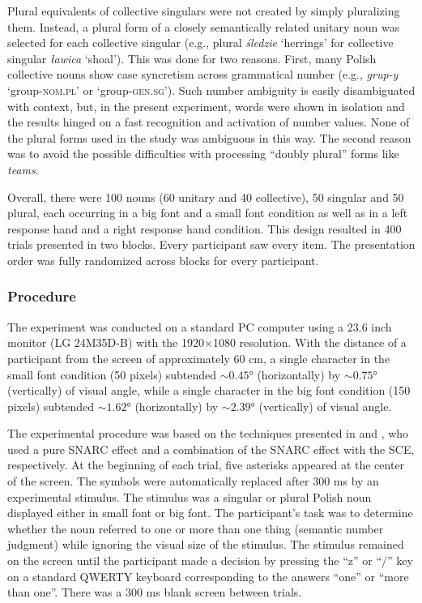 \documentclass[output=paper]{langscibook}
\begin{document}
Plural equivalents of collective singulars were not created by simply pluralizing them. Instead, a plural form of a closely semantically related unitary noun was selected for each collective singular (e.g., plural \textit{śledzie} ‘herrings’ for collective singular \textit{ławica} ‘shoal’). This was done for two reasons. First, many Polish collective nouns show case syncretism across grammatical number (e.g., \mbox{\textit{grup-y}} ‘group-\textsc{nom.pl}’ or ‘group-\textsc{gen.sg}’). Such number ambiguity is easily disambiguat\-ed with context, but, in the present experiment, words were shown in isolation and the results hinged on a fast recognition and activation of number values. None of the plural forms used in the study was ambiguous in this way. The second reason was to avoid the possible difficulties with processing “doubly plural” forms like \textit{teams}. 

Overall, there were 100 nouns (60 unitary and 40 collective), 50 singular and 50 plural, each occurring in a big font and a small font condition as well as in a left response hand and a right response hand condition. This design resulted in 400 trials presented in two blocks. Every participant saw every item. The presentation order was fully randomized across blocks for every participant.

\subsubsection{Procedure}
The experiment was conducted on a standard PC computer using a 23.6 inch monitor (LG 24M35D-B) with the 1920×1080 resolution. With the distance of a participant from the screen of approximately 60 cm, a single character in the small font condition (50 pixels) subtended $\sim0.45°$ (horizontally) by $\sim0.75°$ (vertically) of visual angle, while a single character in the big font condition (150 pixels) subtended $\sim1.62°$ (horizontally) by $\sim2.39°$ (vertically) of visual angle.

The experimental procedure was based on the techniques presented in \citet{rottgerGrammaticalNumberElicits2015} and  \citet{fitousiRoleParityPhysical2009}, who used a pure SNARC effect and a combination of the SNARC effect with the SCE, respectively. At the beginning of each trial, five asterisks appeared at the center of the screen. The symbols were automatically replaced after 300 ms by an experimental stimulus. The stimulus was a singular or plural Polish noun displayed either in small font or big font. The participant’s task was to determine whether the noun referred to one or more than one thing (semantic number judgment) while ignoring the visual size of the stimulus. The stimulus remained on the screen until the participant made a decision by pressing the “z” or “/” key on a standard QWERTY keyboard corresponding to the answers “one” or “more than one”. There was a 300 ms blank screen between trials.
\end{document}
